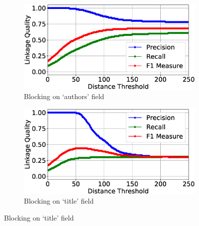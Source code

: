 \documentclass{llncs}
\begin{document}
\begin{figure}
\begin{subfigure}{.5\textwidth}
  \centering
\includegraphics[width=\textwidth]{figures/plotLQ-cora-trad-authors}
\vspace{-6mm}
\caption{Blocking on `authors' field}
\end{subfigure}%
\begin{subfigure}{.5\textwidth}
  \centering
\includegraphics[width=\textwidth]{figures/plotLQ-cora-trad-title}
\vspace{-6mm}
\caption{Blocking on `title' field}
\end{subfigure} \vspace{5mm}


\end{figure}
\end{document}
